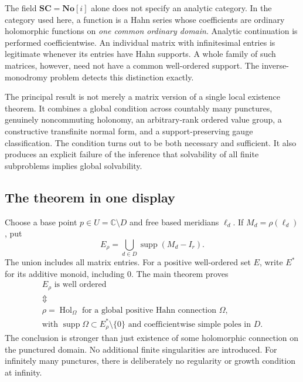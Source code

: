 \documentclass[11pt,letterpaper]{article}
\numberwithin{equation}{section}
\theoremstyle{definition}
\theoremstyle{remark}
\newcommand{\C}{\mathbb C}
\newcommand{\No}{\mathbf{No}}
\newcommand{\SC}{\mathbf{SC}}
\newcommand{\supp}{\operatorname{supp}}
\newcommand{\Hol}{\operatorname{Hol}}
\begin{document}
The field $\SC=\No[i]$ alone does not specify an analytic category. In the
category used here, a function is a Hahn series whose coefficients are
ordinary holomorphic functions on \emph{one common ordinary domain}.
Analytic continuation is performed coefficientwise. An individual matrix
with infinitesimal entries is legitimate whenever its entries have Hahn
supports. A whole family of such matrices, however, need not have a common
well-ordered support. The inverse-monodromy problem detects this distinction
exactly.

The principal result is not merely a matrix version of a single local
existence theorem. It combines a global condition across countably many
punctures, genuinely noncommuting holonomy, an arbitrary-rank ordered value
group, a constructive transfinite normal form, and a support-preserving gauge
classification. The condition turns out to be both necessary and sufficient.
It also produces an explicit failure of the inference that solvability of
all finite subproblems implies global solvability.

\subsection{The theorem in one display}
Choose a base point $p\in U=\C\setminus D$ and free based meridians
$\ell_d$. If $M_d=\rho(\ell_d)$, put
\begin{equation}\label{eq:headline-support}
 E_\rho=\bigcup_{d\in D}\supp(M_d-I_r).
\end{equation}
The union includes all matrix entries. For a positive well-ordered set $E$,
write $E^*$ for its additive monoid, including $0$. The main theorem proves
\begin{equation}\label{eq:headline}
\begin{gathered}
 E_\rho\text{ is well ordered}\\[-2pt]
 \Updownarrow\\[-2pt]
 \rho=\Hol_\Omega\text{ for a global positive Hahn connection }\Omega,\\
 \text{with }\supp\Omega\subset E_\rho^*\setminus\{0\}
 \text{ and coefficientwise simple poles in }D.
\end{gathered}
\end{equation}
The conclusion is stronger than just existence of some holomorphic
connection on the punctured domain. No additional finite singularities are
introduced. For infinitely many punctures, there is deliberately no
regularity or growth condition at infinity.
\end{document}
